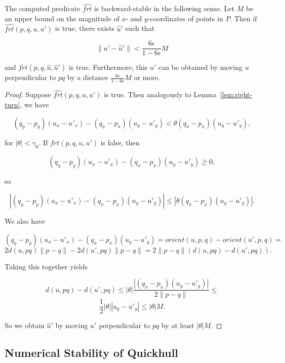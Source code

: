 \begin{lemma}\label{lem:farther}
    The computed predicate $\widehat{frt}$ is backward-stable in the 
    following sense. Let $M$ be an upper bound on the magnitude of 
    $x$- and $y$-coordinates of points in $P$. 
    Then if $\widehat{frt}(p, q, u, u')$ is true, there exists 
    $\hat{u}'$ such that

    $$\lVert u' - \hat{u}' \rVert < \frac{6\epsilon}{1 - 6\epsilon}M$$

    and $frt(p, q, \hat{u}, \hat{u}')$ is true. Furthermore, this 
    $\hat{u}'$ can be obtained by moving $u$ perpendicular to $pq$
    by a distance $\frac{6\epsilon}{1 - 6\epsilon}M$ or more.
\end{lemma}

\begin{proof}
    Suppose $\widehat{frt}(p, q, u, u')$ is true. Then analogously to 
    Lemma~\ref{lem:right-turn}, we have

    $$(q_y - p_y) (u_x - u'_x) - (q_x - p_x) (u_y - u'_y) < 
            \theta(q_x - p_x) (u_y - u'_y),$$

    for $|\theta| < \gamma_6$. If $frt(p, q, u, u')$ is false, then

    $$(q_y - p_y) (u_x - u'_x) - (q_x - p_x) (u_y - u'_y) \geq 0,$$

    so 

    $$|(q_y - p_y) (u_x - u'_x) - (q_x - p_x) (u_y - u'_y)| \leq 
        |\theta(q_x - p_x) (u_y - u'_y)|.$$

    We also have 

    $$(q_y - p_y) (u_x - u'_x) - (q_x - p_x) (u_y - u'_y) =
       orient(u, p, q) - orient(u', p, q) =$$
    $$2 d(u, pq) \lVert p - q \rVert - 2 d(u', pq) \lVert p - q \rVert = 
        2 \lVert p - q \rVert (d(u, pq) - d(u', pq)).$$

    Taking this together yields

    $$d(u, pq) - d(u', pq) \leq 
       |\theta|\frac{|(q_x - p_x) (u_y - u'_y)|}{2 \lVert p - q \rVert} \leq$$
    $$\frac{1}{2}|\theta| |u_y - u'_y| \leq |\theta|M.$$

    So we obtain $\hat{u}'$ by moving $u'$ perpendicular to $pq$ by at least
    $|\theta|M$.
\end{proof}

\subsection{Numerical Stability of Quickhull}

